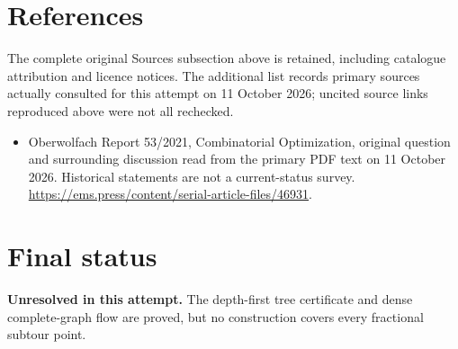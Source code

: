\documentclass[11pt]{article}
\begin{document}
\section{References}
The complete original Sources subsection above is retained, including catalogue attribution and licence notices. The additional list records primary sources actually consulted for this attempt on 11 October 2026; uncited source links reproduced above were not all rechecked.
\begin{itemize}
\item Oberwolfach Report 53/2021, Combinatorial Optimization, original question and surrounding discussion read from the primary PDF text on 11 October 2026. Historical statements are not a current-status survey. \url{https://ems.press/content/serial-article-files/46931}.
\end{itemize}
\section{Final status}
\textbf{Unresolved in this attempt.} The depth-first tree certificate and dense complete-graph flow are proved, but no construction covers every fractional subtour point.
\end{document}
